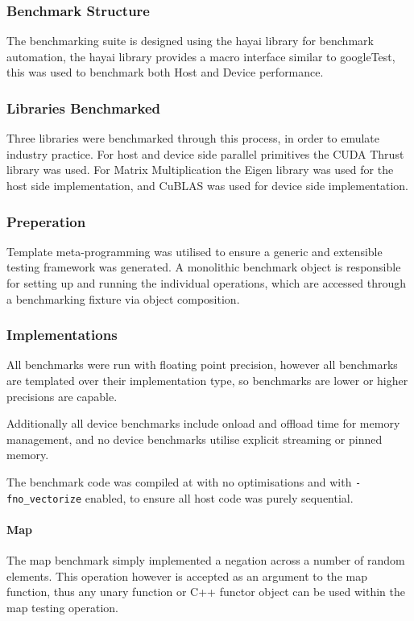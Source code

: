 \subsubsection{Benchmark Structure}
The benchmarking suite is designed using the hayai\cite{hayai} library for benchmark automation,
the hayai library provides a macro interface similar to googleTest, this was used to benchmark both
Host and Device performance.

\subsubsection{Libraries Benchmarked}
Three libraries were benchmarked through this process, in order to emulate industry practice. For
host and device side parallel primitives the CUDA Thrust\cite{thrust} library was used. For Matrix
Multiplication the Eigen\cite{eigen} library was used for the host side implementation, and
CuBLAS\cite{cublas} was used for device side implementation.

\subsubsection{Preperation}
Template meta-programming was utilised to ensure a generic and extensible testing framework was
generated. A monolithic benchmark object is responsible for setting up and running the individual
operations, which are accessed through a benchmarking fixture via object composition.

\subsubsection{Implementations}
All benchmarks were run with floating point precision, however all benchmarks are templated over
their implementation type, so benchmarks are lower or higher precisions are capable.

Additionally all device benchmarks include onload and offload time for memory management, and no
device benchmarks utilise explicit streaming or pinned memory.

The benchmark code was compiled at with no optimisations and with \lstinline{-fno_vectorize} enabled, to ensure
all host code was purely sequential.
\paragraph{Map}
The map benchmark simply implemented a negation across a number of random elements. This operation
however is accepted as an argument to the map function, thus any unary function or C++ functor
object can be used within the map testing operation.

